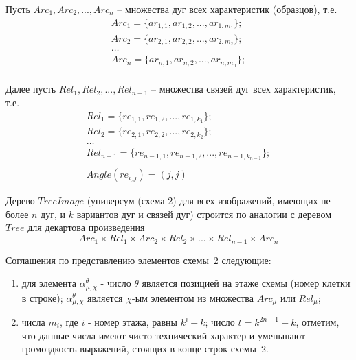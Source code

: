 Пусть $Arc_1, Arc_2, ..., Arc_n$ – множества дуг всех характеристик (образцов), т.е.
\begin{equation}
\begin{array}{c}
Arc_1 = \{ar_{1,1}, ar_{1,2}, ..., ar_{1,m_1}\}; \\
Arc_2 = \{ ar_{2,1}, ar_{2,2}, ..., ar_{2,m_2}\}; \\
\dots \\
Arc_n = \{ ar_{n,1}, ar_{n,2}, ..., ar_{n,m_n}\}; \\
\end{array}
\end{equation}

Далее пусть $Rel_1, Rel_2, ..., Rel_{n-1}$ – множества связей дуг всех характеристик, т.е. 
\begin{equation}
\begin{array}{c}
Rel_1 = \{re_{1,1}, re_{1,2}, ..., re_{1,k_1}\}; \\
Rel_2 = \{ re_{2,1}, re_{2,2}, ..., re_{2,k_2}\}; \\
\dots \\
Rel_{n-1} = \{ re_{{n-1},1}, re_{{n-1},2}, ..., re_{{n-1},k_{n-1}}\}; \\
\\
Angle(re_{i,j})=(j,j)
\end{array}
\end{equation}

Дерево $TreeImage$ (универсум (схема 2) для всех изображений, имеющих не более $n$ дуг, и $k$ вариантов дуг и связей дуг) строится по аналогии с деревом $Tree$ для декартова произведения
$$Arc_1 \times Rel_1 \times Arc_2 \times Rel_2 \times ... \times Rel_{n-1} \times Arc_n $$


Соглашения по представлению элементов схемы~2 следующие:
\begin{enumerate}
\item для элемента $\alpha_{\mu,\chi}^\theta$ - число $\theta$ является позицией на этаже схемы (номер клетки в строке); $\alpha_{\mu,\chi}^\theta$ является $\chi$-ым элементом из множества $Arc_{\mu}$ или $Rel_{\mu}$;
\item числа $m_i$, где $i$ - номер этажа, равны $k^i - k$; число $t = k^{2n-1}-k$, отметим, что данные числа имеют чисто технический характер и уменьшают громоздкость выражений, стоящих в конце строк схемы~2.
\end{enumerate}

